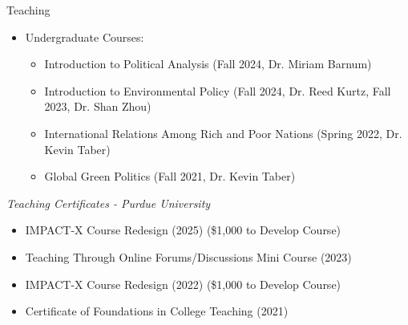 \documentclass{resume} %
\begin{document}
\begin{rSection}{Teaching}
\begin{itemize}
    \item Undergraduate Courses:
    \begin{itemize}

    \item Introduction to Political Analysis (Fall 2024, Dr. Miriam Barnum)
    \item Introduction to Environmental Policy (Fall 2024, Dr. Reed Kurtz, Fall 2023, Dr. Shan Zhou)
    \item International Relations Among Rich and Poor Nations (Spring 2022, Dr. Kevin Taber)
    \item Global Green Politics (Fall 2021, Dr. Kevin Taber)
    \end{itemize}
\end{itemize}


{\it Teaching Certificates - Purdue University} 
\begin{itemize}
    \item IMPACT-X Course Redesign (2025) (\$1,000 to Develop Course)
    \item Teaching Through Online Forums/Discussions Mini Course (2023)
    \item IMPACT-X Course Redesign (2022) (\$1,000 to Develop Course)
    \item Certificate of Foundations in College Teaching (2021)
\end{itemize}

\end{rSection}

\end{document}
